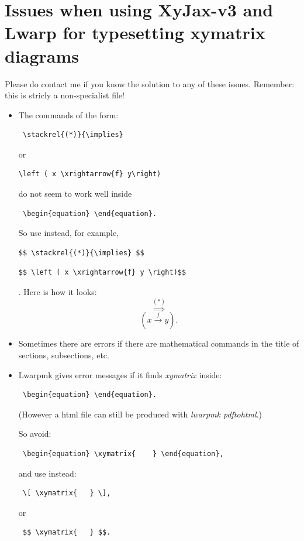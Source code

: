 \documentclass[a4paper,12pt]{article}
\newtheorem{Fundamental Theorem}{Fundamental Theorem}
\begin{document}
\section{Issues when using XyJax-v3 and Lwarp for typesetting xymatrix diagrams}
Please do contact me if you know the solution to any of these issues. Remember: this is stricly a non-specialist file!



\begin{itemize}
\item The commands of the form:
\begin{verbatim} \stackrel{(*)}{\implies} \end{verbatim}
or
\begin{verbatim}\left ( x \xrightarrow{f} y\right) \end{verbatim}
do not seem to work well inside
\begin{verbatim} \begin{equation} \end{equation}. \end{verbatim}
So use instead, for example,
\begin{verbatim}$$ \stackrel{(*)}{\implies} $$ \end{verbatim}
\begin{verbatim}$$ \left ( x \xrightarrow{f} y \right)$$\end{verbatim}.
Here is how it looks:
$$ \stackrel{(*)}{\implies}$$
$$\left ( x \xrightarrow{f} y \right) .$$

\item Sometimes there are errors if there are mathematical commands in the title of sections, subsections, etc.
\item Lwarpmk gives error messages if it finds \textit{xymatrix} inside:
\begin{verbatim} \begin{equation} \end{equation}. \end{verbatim}
(However a html file can still be produced with \textit{lwarpmk pdftohtml}.)

\medskip

\noindent So avoid: \begin{verbatim} \begin{equation} \xymatrix{    } \end{equation}, \end{verbatim}
and use instead:
 \begin{verbatim} \[ \xymatrix{   } \], \end{verbatim}
 or
  \begin{verbatim} $$ \xymatrix{   } $$. \end{verbatim}


\end{itemize}
\end{document}
